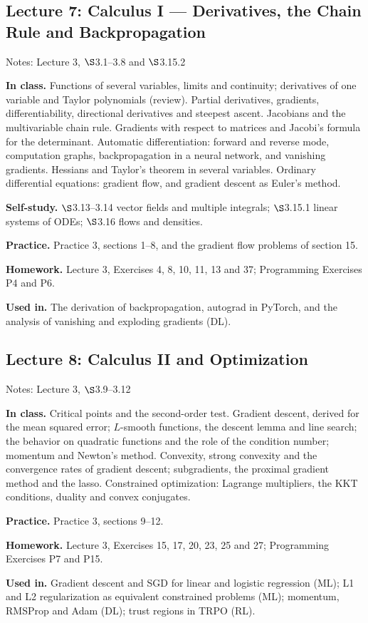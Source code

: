 \documentclass[11pt]{article}
\newcommand{\lecture}[3]{\subsection*{Lecture #1: #2}\textcolor{black!60}{Notes: #3}\par}
\newcommand{\block}[1]{\par\smallskip\textbf{#1}\quad}
\begin{document}
\lecture{7}{Calculus I --- Derivatives, the Chain Rule and Backpropagation}{Lecture 3, $\S$3.1--3.8 and $\S$3.15.2}
\block{In class.} Functions of several variables, limits and continuity; derivatives of one variable and Taylor polynomials (review). Partial derivatives, gradients, differentiability, directional derivatives and steepest ascent. Jacobians and the multivariable chain rule. Gradients with respect to matrices and Jacobi's formula for the determinant. Automatic differentiation: forward and reverse mode, computation graphs, backpropagation in a neural network, and vanishing gradients. Hessians and Taylor's theorem in several variables. Ordinary differential equations: gradient flow, and gradient descent as Euler's method.
\block{Self-study.} $\S$3.13--3.14 vector fields and multiple integrals; $\S$3.15.1 linear systems of ODEs; $\S$3.16 flows and densities.
\block{Practice.} Practice 3, sections 1--8, and the gradient flow problems of section 15.
\block{Homework.} Lecture 3, Exercises 4, 8, 10, 11, 13 and 37; Programming Exercises P4 and P6.
\block{Used in.} The derivation of backpropagation, autograd in PyTorch, and the analysis of vanishing and exploding gradients (DL).

\lecture{8}{Calculus II and Optimization}{Lecture 3, $\S$3.9--3.12}
\block{In class.} Critical points and the second-order test. Gradient descent, derived for the mean squared error; $L$-smooth functions, the descent lemma and line search; the behavior on quadratic functions and the role of the condition number; momentum and Newton's method. Convexity, strong convexity and the convergence rates of gradient descent; subgradients, the proximal gradient method and the lasso. Constrained optimization: Lagrange multipliers, the KKT conditions, duality and convex conjugates.
\block{Practice.} Practice 3, sections 9--12.
\block{Homework.} Lecture 3, Exercises 15, 17, 20, 23, 25 and 27; Programming Exercises P7 and P15.
\block{Used in.} Gradient descent and SGD for linear and logistic regression (ML); L1 and L2 regularization as equivalent constrained problems (ML); momentum, RMSProp and Adam (DL); trust regions in TRPO (RL).
\end{document}
